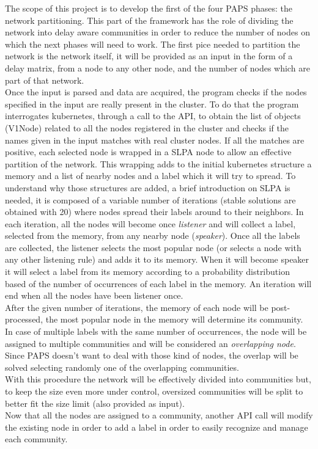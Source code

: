The scope of this project is to develop the first of the four PAPS phases: the network 
partitioning. This part of the framework has the role of dividing the network into 
delay aware communities in order to reduce the number of nodes on which the next phases
will need to work. The first pice needed to partition the network is the network itself,
it will be provided as an input in the form of a delay matrix, from a node to any other
node, and the number of nodes which are part of that network. \\ 
Once the input is parsed and data are acquired, the program checks if the nodes specified 
in the input are really present in the cluster. To do that the program interrogates 
kubernetes, through a call to the API, to obtain the list of objects (V1Node) related to
all the nodes registered in the cluster and checks if the names given in the
input matches with real cluster nodes. If all the matches are positive, each selected 
node is wrapped in a SLPA \cite{SLPA} node to allow an effective partition of the network.
This wrapping adds to the initial kubernetes structure a memory and a list of nearby 
nodes and a label which it will try to spread. To understand why those structures are 
added, a brief introduction on SLPA is needed, it is composed of a variable number of 
iterations (stable solutions are obtained with 20) where nodes spread their labels 
around to their neighbors. In each iteration, all the nodes will become once 
\textit{listener} and will collect a label, selected from the memory, from any nearby 
node (\textit{speaker}). Once all the labels are collected, the listener selects the 
most popular node (or selects a node with any other listening rule) and adds it to its
memory. When it will become speaker it will select a label from its memory according 
to a probability distribution based of the number of occurrences of each label in the 
memory. An iteration will end when all the nodes have been listener once. \\
After the given number of iterations, the memory of each node will be post-processed, 
the most popular node in the memory will determine its community. In case of multiple
labels with the same number of occurrences, the node will be assigned to multiple 
communities and will be considered an \textit{overlapping node}. Since PAPS doesn't 
want to deal with those kind of nodes, the overlap will be solved selecting randomly 
one of the overlapping communities. \\
With this procedure the network will be effectively divided into communities but, 
to keep the size even more under control, oversized communities will be split to better
fit the size limit (also provided as input). \\
Now that all the nodes are assigned to a community, another API call will modify the
existing node in order to add a label in order to easily recognize and manage each community.

